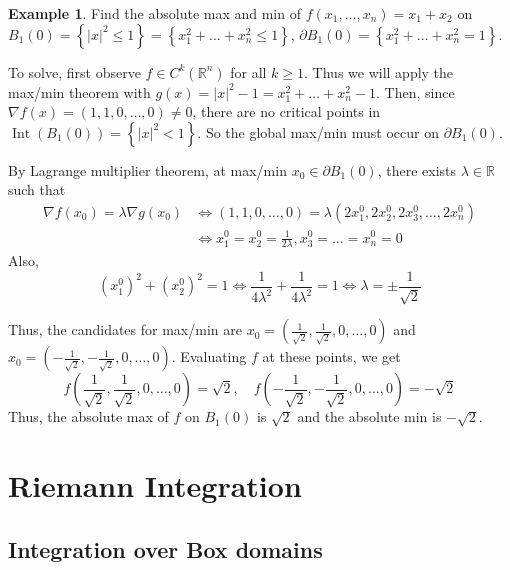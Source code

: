 \documentclass[11pt]{article}
\theoremstyle{definition}
\newtheorem{exmp}{Example}[section]
\theoremstyle{definition}
\newcommand{\R}[0]{\mathbb{R}}
\theoremstyle{definition}
\theoremstyle{remark}
\begin{document}
\begin{exmp}
    Find the absolute max and min of $f(x_1, \dots, x_n) = x_1 + x_2$ on 
    $B_1(0) = \left\{ |x|^2 \leq 1 \right\} = \left\{ x_1^2 + \dots + x_n^2 \leq 1 \right\} $,
    $\partial B_1(0) = \left\{ x_1^2 + \dots + x_n^2 = 1 \right\} $.
    
    To solve, first observe $f \in C^k(\R^n)$ for all $k \geq 1$. Thus we will apply the max/min
    theorem with $g(x) = |x|^2 - 1 = x_1^2 + \dots + x_n^2 - 1$. Then, since
    $\nabla f(x) = (1, 1, 0, \dots, 0) \neq 0$, there are no critical points in $\operatorname{Int}
    (B_1(0)) = \left\{ |x|^2 < 1  \right\} $. So the global max/min must occur on 
    $\partial B_1(0)$.
    
    By Lagrange multiplier theorem, at max/min $x_0 \in \partial B_1(0)$, 
    there exists $\lambda \in \R$ such that 
    \begin{align}
        \nabla f(x_0) = \lambda \nabla g(x_0) &\Leftrightarrow (1, 1, 0, \dots, 0) = \lambda 
        (2x_{1}^0, 2x_{2}^0, 2x_{3}^0, \dots, 2x_{n}^0) \\
        &\Leftrightarrow x_{1}^0 = x_{2}^0 = \frac{1}{2\lambda}, x_{3}^0 = \dots = x_{n}^0 = 0
    \end{align}
    Also, 
    \[
        (x_1^0)^2 + (x_2^0)^2 = 1 \Leftrightarrow \frac{1}{4\lambda^2} + \frac{1}{4\lambda^2} = 1
        \Leftrightarrow \lambda = \pm \frac{1}{\sqrt{2}}
    \] 

    Thus, the candidates for max/min are $x_0 = \left( \frac{1}{\sqrt{2}}, \frac{1}{\sqrt{2}}, 0, \dots, 0 \right) $
    and $x_0 = \left( -\frac{1}{\sqrt{2}}, -\frac{1}{\sqrt{2}}, 0, \dots, 0 \right) $. Evaluating $f$ at these points, we get
    \[
        f\left( \frac{1}{\sqrt{2}}, \frac{1}{\sqrt{2}}, 0, \dots, 0 \right) = \sqrt{2}, \quad f\left( -\frac{1}{\sqrt{2}}, -\frac{1}{\sqrt{2}}, 0, \dots, 0 \right) = -\sqrt{2}
    \]
    Thus, the absolute max of $f$ on $B_1(0)$ is $\sqrt{2}$ and the absolute min is $-\sqrt{2}$.
\end{exmp}


\section{Riemann Integration}
\subsection{Integration over Box domains}
\end{document}
